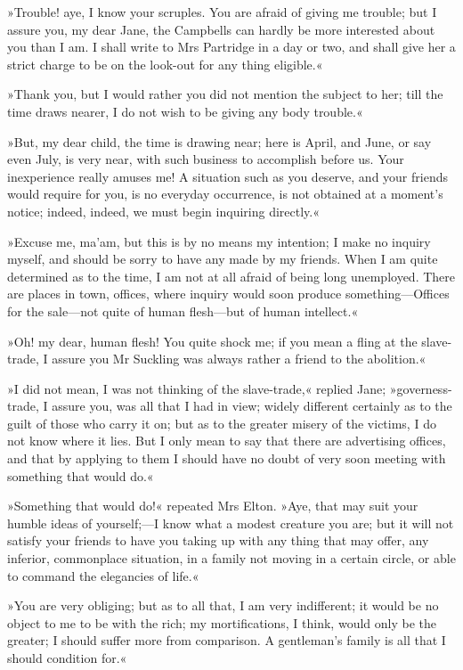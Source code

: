 »Trouble! aye, I know your scruples. You are afraid of giving me trouble; but I assure you, my dear Jane, the Campbells can hardly be more interested about you than I am. I shall write to Mrs Partridge in a day or two, and shall give her a strict charge to be on the look-out for any thing eligible.«

»Thank you, but I would rather you did not mention the subject to her; till the time draws nearer, I do not wish to be giving any body trouble.«

»But, my dear child, the time is drawing near; here is April, and June, or say even July, is very near, with such business to accomplish before us. Your inexperience really amuses me! A situation such as you deserve, and your friends would require for you, is no everyday occurrence, is not obtained at a moment's notice; indeed, indeed, we must begin inquiring directly.«

»Excuse me, ma'am, but this is by no means my intention; I make no inquiry myself, and should be sorry to have any made by my friends. When I am quite determined as to the time, I am not at all afraid of being long unemployed. There are places in town, offices, where inquiry would soon produce something—Offices for the sale—not quite of human flesh—but of human intellect.«

»Oh! my dear, human flesh! You quite shock me; if you mean a fling at the slave-trade, I assure you Mr Suckling was always rather a friend to the abolition.«

»I did not mean, I was not thinking of the slave-trade,« replied Jane; »governess-trade, I assure you, was all that I had in view; widely different certainly as to the guilt of those who carry it on; but as to the greater misery of the victims, I do not know where it lies. But I only mean to say that there are advertising offices, and that by applying to them I should have no doubt of very soon meeting with something that would do.«

»Something that would do!« repeated Mrs Elton. »Aye, that may suit your humble ideas of yourself;—I know what a modest creature you are; but it will not satisfy your friends to have you taking up with any thing that may offer, any inferior, commonplace situation, in a family not moving in a certain circle, or able to command the elegancies of life.«

»You are very obliging; but as to all that, I am very indifferent; it would be no object to me to be with the rich; my mortifications, I think, would only be the greater; I should suffer more from comparison. A gentleman's family is all that I should condition for.«


